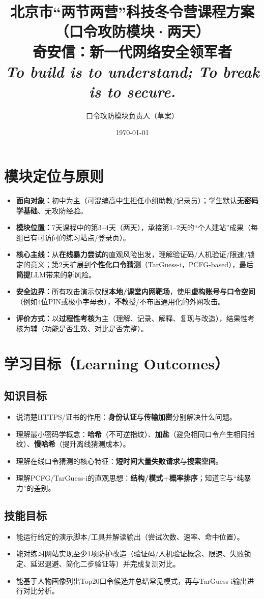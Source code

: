 \documentclass[UTF8,a4paper,12pt]{ctexart}
\title{北京市``两节两营''科技冬令营课程方案（口令攻防模块·两天）\\
\large 奇安信：新一代网络安全领军者\\
\normalsize \textit{To build is to understand; To break is to secure.}}
\author{口令攻防模块负责人（草案）}
\date{\today}
\begin{document}
\maketitle

\section*{模块定位与原则}
\begin{itemize}
  \item \textbf{面向对象：}初中为主（可混编高中生担任小组助教/记录员）；学生默认\textbf{无密码学基础}、无攻防经验。
  \item \textbf{模块位置：}7天课程中的第3--4天（两天），承接第1--2天的``个人建站''成果（每组已有可访问的练习站点/登录页）。
  \item \textbf{核心主线：}从\textbf{在线暴力尝试}的直观风险出发，理解验证码/人机验证/限速/锁定的意义；第2天扩展到\textbf{个性化口令猜测}（TarGuess-i，PCFG-based），最后\textbf{简提}LLM带来的新风险。
  \item \textbf{安全边界：}所有攻击演示仅限\textbf{本地/课堂内网靶场}，使用\textbf{虚构账号与口令空间}（例如4位PIN或极小字母表），\textbf{不}教授/不布置通用化的外网攻击。
  \item \textbf{评价方式：}以\textbf{过程性考核}为主（理解、记录、解释、复现与改造），结果性考核为辅（功能是否生效、对比是否完整）。
\end{itemize}

\section{学习目标（Learning Outcomes）}
\subsection*{知识目标}
\begin{itemize}
  \item 说清楚HTTPS/证书的作用：\textbf{身份认证}与\textbf{传输加密}分别解决什么问题。
  \item 理解最小密码学概念：\textbf{哈希}（不可逆指纹）、\textbf{加盐}（避免相同口令产生相同指纹）、\textbf{慢哈希}（提升离线猜测成本）。
  \item 理解在线口令猜测的核心特征：\textbf{短时间大量失败请求}与\textbf{搜索空间}。
  \item 理解PCFG/TarGuess-i的直观思想：\textbf{结构/模式+概率排序}；知道它与``纯暴力''的差别。
\end{itemize}

\subsection*{技能目标}
\begin{itemize}
  \item 能运行给定的演示脚本/工具并解读输出（尝试次数、速率、命中位置）。
  \item 能对练习网站实现至少1项防护改造（验证码/人机验证概念、限速、失败锁定、延迟退避、简化二步验证等）并完成复测对比。
  \item 能基于人物画像列出Top20口令候选并总结常见模式，再与TarGuess-i输出进行对比分析。
\end{itemize}
\end{document}
